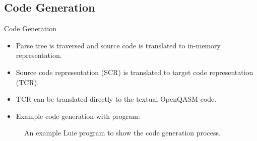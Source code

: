 
\subsection{Code Generation}
\begin{frame}{Code Generation}
    \begin{itemize}
        \item Parse tree is traversed and source code is translated to in-memory representation.
        \item Source code representation (SCR) is translated to target code representation (TCR).
        \item TCR can be translated directly to the textual OpenQASM code.
        \item Example code generation with program:
    \end{itemize}
    \vfill
    \begin{figure}
        \centering
        
        \caption{An example Luie program to show the code generation process.}
    \end{figure}
\end{frame}

